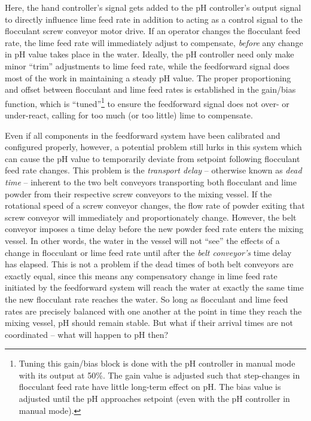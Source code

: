 Here, the hand controller's signal gets added to the pH controller's output signal to directly influence lime feed rate in addition to acting as a control signal to the flocculant screw conveyor motor drive.  If an operator changes the flocculant feed rate, the lime feed rate will immediately adjust to compensate, \textit{before} any change in pH value takes place in the water.  Ideally, the pH controller need only make minor ``trim'' adjustments to lime feed rate, while the feedforward signal does most of the work in maintaining a steady pH value.  The proper proportioning and offset between flocculant and lime feed rates is established in the gain/bias function, which is ``tuned''\footnote{Tuning this gain/bias block is done with the pH controller in manual mode with its output at 50\%.  The gain value is adjusted such that step-changes in flocculant feed rate have little long-term effect on pH.  The bias value is adjusted until the pH approaches setpoint (even with the pH controller in manual mode).} to ensure the feedforward signal does not over- or under-react, calling for too much (or too little) lime to compensate.

Even if all components in the feedforward system have been calibrated and configured properly, however, a potential problem still lurks in this system which can cause the pH value to temporarily deviate from setpoint following flocculant feed rate changes.  This problem is the \textit{transport delay} -- otherwise known as \textit{dead time} -- inherent to the two belt conveyors transporting both flocculant and lime powder from their respective screw conveyors to the mixing vessel.  If the rotational speed of a screw conveyor changes, the flow rate of powder exiting that screw conveyor will immediately and proportionately change.  However, the belt conveyor imposes a time delay before the new powder feed rate enters the mixing vessel.  In other words, the water in the vessel will not ``see'' the effects of a change in flocculant or lime feed rate until after the \textit{belt conveyor's} time delay has elapsed.  This is not a problem if the dead times of both belt conveyors are exactly equal, since this means any compensatory change in lime feed rate initiated by the feedforward system will reach the water at exactly the same time the new flocculant rate reaches the water.  So long as flocculant and lime feed rates are precisely balanced with one another at the point in time they reach the mixing vessel, pH should remain stable.  But what if their arrival times are not coordinated -- what will happen to pH then?    

